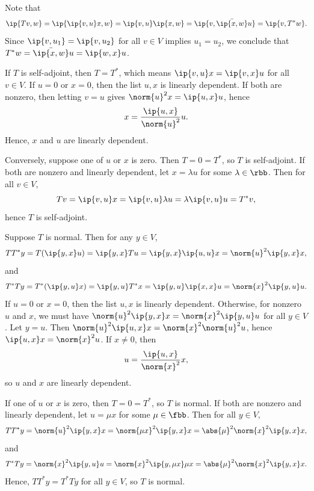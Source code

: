 \begin{sol}
    Note that
    \[
        \ip{Tv, w} = \ip{\ip{v, u}x, w} = \ip{v, u}\ip{x, w} = \ip{v, \bar{\ip{x, w}}u} = \ip{v, T^\ast w}.
    \]
    Since $\ip{v, u_1} = \ip{v, u_2}$ for all $v \in V$ implies $u_1 = u_2$, we conclude that $T^\ast w = \bar{\ip{x, w}}u = \ip{w, x}u$.
    \begin{subexercises}
        \item
        \rightimp If $T$ is self-adjoint, then $T = T^\ast$, which means $\ip{v, u}x = \ip{v, x}u$ for all $v \in V$.
        If $u = 0$ or $x = 0$, then the list $u, x$ is linearly dependent.
        If both are nonzero, then letting $v = u$ gives $\norm{u}^2 x = \ip{u, x}u$, hence
        \[
            x = \frac{\ip{u, x}}{\norm{u}^2} u.
        \]
        Hence, $x$ and $u$ are linearly dependent.

        \leftimp Conversely, suppose one of $u$ or $x$ is zero. Then $T = 0 = T^\ast$, so $T$ is self-adjoint.
        If both are nonzero and linearly dependent, let $x = \lambda u$ for some $\lambda \in \rbb$. Then for all $v \in V$,
        \[
            Tv = \ip{v, u}x = \ip{v, u} \lambda u = \lambda \ip{v, u} u = T^\ast v,
        \]
        hence $T$ is self-adjoint.
        \item
        \rightimp Suppose $T$ is normal. Then for any $y \in V$,
        \[
            TT^\ast y = T(\ip{y, x}u) = \ip{y, x}Tu = \ip{y, x}\ip{u, u}x = \norm{u}^2 \ip{y, x}x,
        \]
        and
        \[
            T^\ast T y = T^\ast(\ip{y, u}x) = \ip{y, u}T^\ast x = \ip{y, u}\ip{x, x}u = \norm{x}^2 \ip{y, u}u.
        \]
        If $u = 0$ or $x = 0$, then the list $u, x$ is linearly dependent.
        Otherwise, for nonzero $u$ and $x$, we must have $\norm{u}^2 \ip{y, x}x = \norm{x}^2 \ip{y, u}u$ for all $y \in V$.
        Let $y = u$. Then $\norm{u}^2 \ip{u, x}x = \norm{x}^2 \norm{u}^2 u$, hence $\ip{u, x}x = \norm{x}^2 u$.
        If $x \neq 0$, then
        \[
            u = \frac{\ip{u, x}}{\norm{x}^2} x,
        \]
        so $u$ and $x$ are linearly dependent.

        \leftimp If one of $u$ or $x$ is zero, then $T = 0 = T^\ast$, so $T$ is normal.
        If both are nonzero and linearly dependent, let $u = \mu x$ for some $\mu \in \fbb$.
        Then for all $y \in V$,
        \[
            TT^\ast y = \norm{u}^2 \ip{y, x}x = \norm{\mu x}^2 \ip{y, x}x = \abs{\mu}^2 \norm{x}^2 \ip{y, x}x,
        \]
        and
        \[
            T^\ast T y = \norm{x}^2 \ip{y, u}u = \norm{x}^2 \ip{y, \mu x} \mu x = \abs{\mu}^2 \norm{x}^2 \ip{y, x}x.
        \]
        Hence, $TT^\ast y = T^\ast T y$ for all $y \in V$, so $T$ is normal. \qedhere
    \end{subexercises}
\end{sol}

